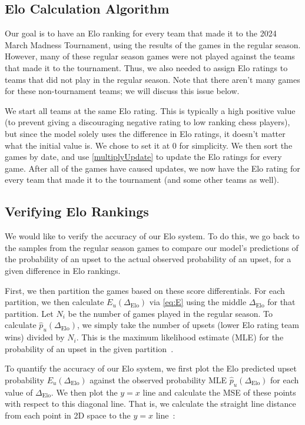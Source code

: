\documentclass{article}
\begin{document}
\subsection{Elo Calculation Algorithm}
Our goal is to have an Elo ranking for every team that made it to the 2024 March Madness Tournament, using the results of the games in the regular season. However, many of these regular season games were not played against the teams that made it to the tournament. Thus, we also needed to assign Elo ratings to teams that did not play in the regular season. Note that there aren't many games for these non-tournament teams; we will discuss this issue below. 

We start all teams at the same Elo rating. This is typically a high positive value (to prevent giving a discouraging negative rating to low ranking chess players), but since the model solely uses the difference in Elo ratings, it doesn't matter what the initial value is. We chose to set it at 0 for simplicity. We then sort the games by date, and use \autoref{multiplyUpdate} to update the Elo ratings for every game. After all of the games have caused updates, we now have the Elo rating for every team that made it to the tournament (and some other teams as well).


\subsection{Verifying Elo Rankings}\label{verify}
We would like to verify the accuracy of our Elo system. To do this, we go back to the samples from the regular season games to compare our model's predictions of the probability of an upset to the actual observed probability of an upset, for a given difference in Elo rankings. 

First, we then partition the games based on these score differentials. For each partition, we then calculate $E_u(\Delta_{\text{Elo}})$ via \autoref{eq:E} using the middle $\Delta_{\text{Elo}}$ for that partition. Let $N_i$ be the number of games played in the regular season. To calculate $\hat{p}_u(\Delta_{\text{Elo}})$, we simply take the number of upsets (lower Elo rating team wins) divided by $N_i$. This is the maximum likelihood estimate (MLE) for the probability of an upset in the given partition~\cite{statproofbookMaximumLikelihood}.




To quantify the accuracy of our Elo system, we first plot the Elo predicted upset probability $E_u(\Delta_{\text{Elo}})$ against the observed probability MLE $\hat{p}_u(\Delta_{\text{Elo}})$ for each value of $\Delta_{\text{Elo}}$. We then plot the $y=x$ line and calculate the MSE of these points with respect to this diagonal line. That is, we calculate the straight line distance from each point in 2D space to the $y=x$ line~\cite{enwiki:1235411332}:
\end{document}
